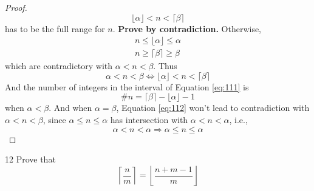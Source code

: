 \documentclass[a4paper,12pt]{article}
\theoremstyle{definition}
\newenvironment{problems}{\begin{list}{}{\renewcommand{\makelabel}[1]{\textbf{##1}\hfil}}}{\end{list}}
\begin{document}
\begin{problems}
\begin{proof}
        \begin{equation}\label{eq:111}
            \lfloor \alpha \rfloor < n < \lceil \beta \rceil
        \end{equation}
        has to be the full range for $n$. \textbf{Prove by contradiction. }
        Otherwise, 
        \begin{equation}\label{eq:112}
            \begin{split}
                n \leq \lfloor \alpha \rfloor \leq \alpha \\
                n \geq \lceil \beta \rceil \geq \beta
            \end{split}
        \end{equation}
        which are contradictory with $\alpha < n<\beta$. Thus
        \begin{equation*}
            \alpha < n < \beta \Leftrightarrow \lfloor \alpha \rfloor < n < \lceil \beta \rceil
        \end{equation*}
        And the number of integers in the interval of Equation \eqref{eq:111} is 
        \begin{equation*}
            \# n = \lceil \beta \rceil - \lfloor \alpha \rfloor - 1
        \end{equation*}
        when $\alpha < \beta$. And when $\alpha=\beta$, Equation \eqref{eq:112} won't lead to contradiction with $\alpha<n<\beta$, since $\alpha \leq n\leq \alpha$ has intersection with $\alpha < n <\alpha$, i.e.,
        \begin{equation*}
            \alpha < n <\alpha \Rightarrow \alpha \leq n\leq \alpha
        \end{equation*}
    \end{proof}
    \item[12]Prove that
    \begin{equation*}
        \left\lceil \frac{n}{m}\right\rceil = \left\lfloor\frac{n+m-1}{m}\right\rfloor

\end{equation*}
\end{problems}
\end{document}
